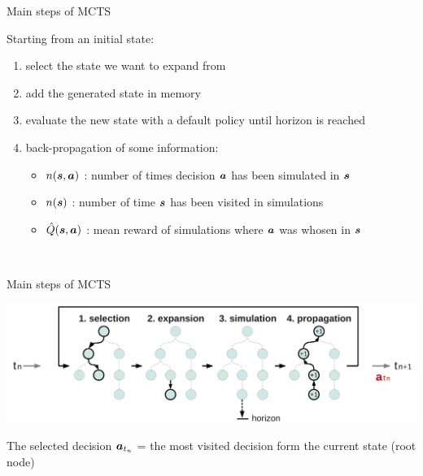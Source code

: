 \begin{frame}{Main steps of MCTS}
{\begin{center}
        \end{center}
    }
    \begin{small}
        Starting from an initial state:%
        \begin{enumerate}
            \item<1-> select the state we want to expand from
            \item<2-> add the generated state in memory
            \item<3-> evaluate the new state with a default policy until horizon is reached
            \item<4-> back-propagation of some information:
            \begin{itemize}
                \item $n(\boldsymbol{s},\boldsymbol{a})$ : number of times decision $\boldsymbol{a}{}$ has been simulated in $\boldsymbol{s}$
                \item $n(\boldsymbol{s})$ : number of time $\boldsymbol{s}$ has been visited in simulations
                \item $\hat{Q}(\boldsymbol{s},\boldsymbol{a})$ : mean reward of simulations where $\boldsymbol{a}$ was whosen in $\boldsymbol{s}$
            \end{itemize}
        \end{enumerate}
        ~\\
    \end{small}
\end{frame}


\begin{frame}{Main steps of MCTS}
    \begin{center}
        \includegraphics[width=.75\linewidth]{figs/tree10f}
    \end{center}

    \begin{block}{The selected decision}
        $\boldsymbol{a}_{t_n}$ = the most visited decision form the current state (root node)
    \end{block}
\end{frame}
